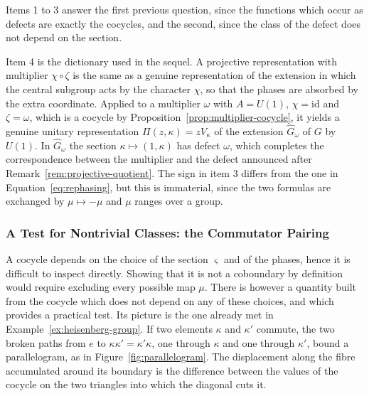 \noindent Items 1 to 3 answer the first previous question, since the functions which occur as defects are exactly the cocycles, and the second, since the class of the defect does not depend on the section.

Item 4 is the dictionary used in the sequel. A projective representation with multiplier $\chi\circ\zeta$ is the same as a genuine representation of the extension in which the central subgroup acts by the character $\chi$, so that the phases are absorbed by the extra coordinate. Applied to a multiplier $\omega$ with $A=U(1)$, $\chi=\mathrm{id}$ and $\zeta=\omega$, which is a cocycle by Proposition~\ref{prop:multiplier-cocycle}, it yields a genuine unitary representation $\Pi(z,\kappa)=zV_\kappa$ of the extension $\widehat{G}_\omega$ of $G$ by $U(1)$. In $\widehat{G}_\omega$ the section $\kappa\mapsto(1,\kappa)$ has defect $\omega$, which completes the correspondence between the multiplier and the defect announced after Remark~\ref{rem:projective-quotient}. The sign in item 3 differs from the one in Equation~\eqref{eq:rephasing}, but this is immaterial, since the two formulas are exchanged by $\mu\mapsto-\mu$ and $\mu$ ranges over a group.

\subsubsection*{A Test for Nontrivial Classes: the Commutator Pairing}

A cocycle depends on the choice of the section $\varsigma$ and of the phases, hence it is difficult to inspect directly. Showing that it is not a coboundary by definition would require excluding every possible map $\mu$. There is however a quantity built from the cocycle which does not depend on any of these choices, and which provides a practical test. Its picture is the one already met in Example~\ref{ex:heisenberg-group}. If two elements $\kappa$ and $\kappa'$ commute, the two broken paths from $e$ to $\kappa\kappa'=\kappa'\kappa$, one through $\kappa$ and one through $\kappa'$, bound a parallelogram, as in Figure~\ref{fig:parallelogram}. The displacement along the fibre accumulated around its boundary is the difference between the values of the cocycle on the two triangles into which the diagonal cuts it.

